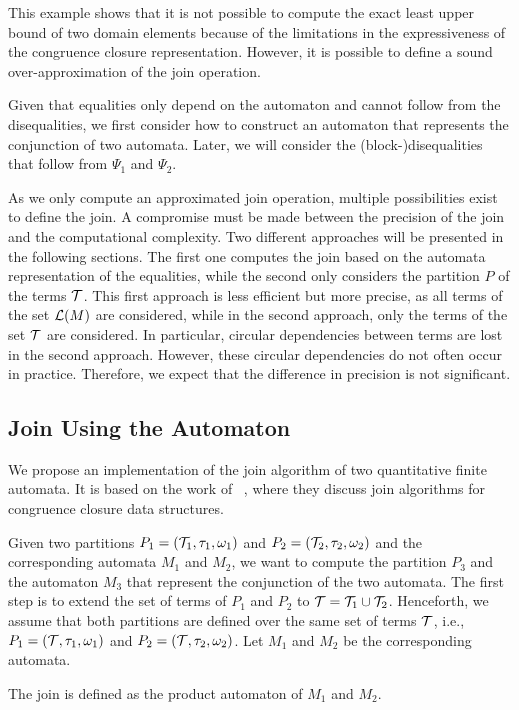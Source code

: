 This example shows that it is not possible to compute the exact least upper bound of two domain elements because of the limitations in the expressiveness of the congruence closure representation.
However, it is possible to define a sound over-approximation of the join operation.

Given that equalities only depend on the automaton and cannot follow from the disequalities, we first consider how to construct an automaton that represents the conjunction of two automata.
Later, we will consider the (block-)disequalities that follow from $\Psi_1$ and $\Psi_2$.

As we only compute an approximated join operation, multiple possibilities exist to define the join.
A compromise must be made between the precision of the join and the computational complexity.
Two different approaches will be presented in the following sections.
The first one computes the join based on the automata representation of the equalities, while the second only considers the partition $P$ of the terms $\mathcal{T}$.
This first approach is less efficient but more precise, as all terms of the set $\mathcal{L}(M)$ are considered, while in the second approach, only the terms of the set $\mathcal{T}$ are considered.
In particular, circular dependencies between terms are lost in the second approach.
However, these circular dependencies do not often occur in practice.
Therefore, we expect that the difference in precision is not significant.

\subsection{Join Using the Automaton}

We propose an implementation of the join algorithm of two quantitative finite automata.
It is based on the work of ~\textcite{join}, where they discuss join algorithms for congruence closure data structures.

Given two partitions $P_1 = (\mathcal{T}_1, \tau_1, \omega_1)$ and $P_2 = (\mathcal{T}_2, \tau_2, \omega_2)$ and the corresponding automata $M_1$ and $M_2$, we want to compute the partition $P_3$ and the automaton $M_3$ that represent the conjunction of the two automata.
The first step is to extend the set of terms of $P_1$ and $P_2$ to $\mathcal{T} = \mathcal{T}_1 \cup \mathcal{T}_2$.
Henceforth, we assume that both partitions are defined over the same set of terms $\mathcal{T}$,
i.e., $P_1 = (\mathcal{T}, \tau_1, \omega_1)$ and $P_2 = (\mathcal{T}, \tau_2, \omega_2)$.
Let $M_1$ and $M_2$ be the corresponding automata.

The join is defined as the product automaton of $M_1$ and $M_2$.

